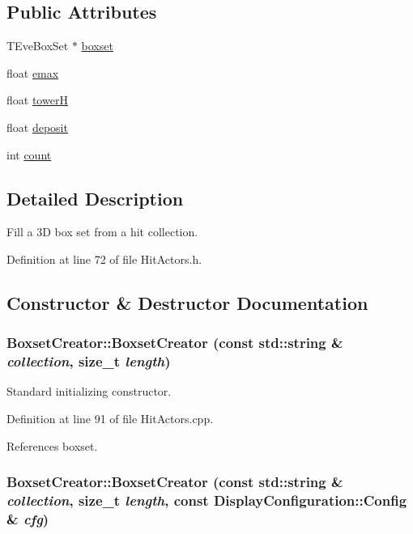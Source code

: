 \subsection*{Public Attributes}
\begin{DoxyCompactItemize}
\item 
TEveBoxSet $\ast$ \hyperlink{struct_d_d4hep_1_1_boxset_creator_a6bc0e7f22172b9a51de26b8e74d2e838}{boxset}
\item 
float \hyperlink{struct_d_d4hep_1_1_boxset_creator_a8be1434aa1149653df8e8b3677971dbe}{emax}
\item 
float \hyperlink{struct_d_d4hep_1_1_boxset_creator_a5a4d59452a3be79b9fd59911eb5b555c}{towerH}
\item 
float \hyperlink{struct_d_d4hep_1_1_boxset_creator_af56e8b100eff17e8581503e334c3c6f6}{deposit}
\item 
int \hyperlink{struct_d_d4hep_1_1_boxset_creator_a3c377c27632c9469ef4f821e24fec619}{count}
\end{DoxyCompactItemize}


\subsection{Detailed Description}
Fill a 3D box set from a hit collection. 

Definition at line 72 of file HitActors.h.

\subsection{Constructor \& Destructor Documentation}
\hypertarget{struct_d_d4hep_1_1_boxset_creator_ae1b4d9e1ebffeed4bce0e2be8ab60396}{
\subsubsection[{BoxsetCreator}]{\setlength{\rightskip}{0pt plus 5cm}BoxsetCreator::BoxsetCreator (const std::string \& {\em collection}, \/  size\_\-t {\em length})}}
\label{struct_d_d4hep_1_1_boxset_creator_ae1b4d9e1ebffeed4bce0e2be8ab60396}


Standard initializing constructor. 

Definition at line 91 of file HitActors.cpp.

References boxset.\hypertarget{struct_d_d4hep_1_1_boxset_creator_a8fd3750929d22eb789720db97194c48e}{
\subsubsection[{BoxsetCreator}]{\setlength{\rightskip}{0pt plus 5cm}BoxsetCreator::BoxsetCreator (const std::string \& {\em collection}, \/  size\_\-t {\em length}, \/  const {\bf DisplayConfiguration::Config} \& {\em cfg})}}
\label{struct_d_d4hep_1_1_boxset_creator_a8fd3750929d22eb789720db97194c48e}


